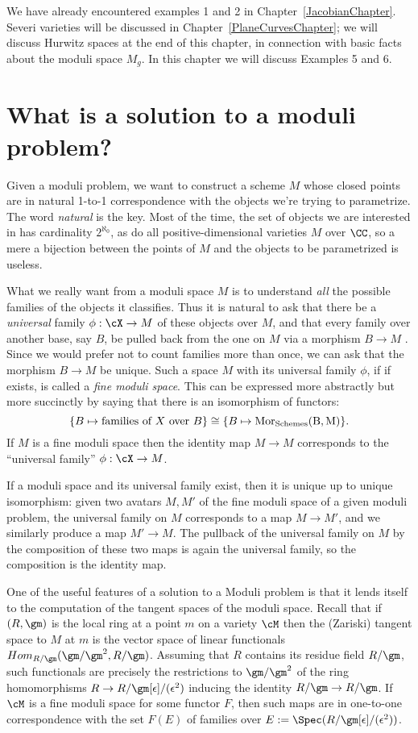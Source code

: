 We have already encountered examples 1 and 2 in Chapter~\ref{JacobianChapter}. Severi varieties will be discussed in Chapter~\ref{PlaneCurvesChapter}; we will discuss Hurwitz spaces at the end of this chapter, in connection with basic facts about the moduli space $M_g$. In this chapter we will discuss Examples 5 and 6.



\section{What is a solution to a moduli problem?}

Given a moduli problem, we want to construct a scheme $M$ whose closed points are in natural  1-to-1 correspondence with the objects we're trying to parametrize. The word \emph{natural} is the key. Most of the time, the set of objects we are interested in has cardinality $2^{\aleph_0}$, as do all positive-dimensional varieties $M$ over $\CC$, so a mere a bijection between the points of $M$ and the objects to be parametrized is useless.

What we really want from a moduli space $M$ is to understand \emph{all} the possible families of the objects it classifies. Thus it is natural to ask that there be a \emph{universal} family $\phi: \cX\to M$ of these objects over $M$,
and that every family over another base, say $B$,  be pulled back from the one on $M$ via a morphism $B\to M$ . Since we would prefer not to count families more than once, we can ask that the 
morphism $B\to M$ be unique. Such a space $M$ with its universal family $\phi$, if if exists, is called a \emph{fine moduli space}. This can be expressed more abstractly but more succinctly by saying that there is an isomorphism of functors:
$$
\{ B \mapsto \text{families of } X \text{ over } B \} \cong \{ B\mapsto \rm{Mor}_{\rm Schemes}(B, M) \}.
$$
If $M$ is a fine moduli space then the identity map $M\to M$ corresponds to the ``universal family'' $\phi: \cX \to M$. 

If a moduli space and its universal family exist, then it is unique up to unique isomorphism: given two avatars $M,M'$ of the fine moduli space of a given moduli problem,
the universal family on $M$ corresponds to a map $M\to M'$, and we similarly produce a map $M'\to M$. The pullback of the universal family on $M$ by the composition of these two maps is again the universal family, so the composition is the identity map.

\def\eps{{\epsilon}}
One of the useful features of a solution to a Moduli problem is that it lends itself to the computation of the tangent spaces
of the moduli space. Recall that if $(R,\gm)$ is the local ring at a point $m$ on a variety $\cM$ then the (Zariski) tangent
space to $M$ at $m$ is the vector space of linear functionals $Hom_{R/\gm}(\gm/\gm^2, R/\gm)$.   Assuming that
$R$ contains its residue field $R/\gm$, such functionals
are precisely the restrictions to $\gm/\gm^2$ of the ring homomorphisms $R \to R/\gm[\eps]/(\eps^2)$ inducing the identity
$R/\gm \to R/\gm$. 
 If $\cM$ is a fine moduli space for some functor $F$, then such maps are in one-to-one correspondence
with the set $F(E)$ of families over $E := \Spec(R/\gm[\eps]/(\eps^2))$. 

